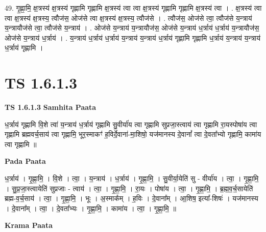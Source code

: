 \documentclass[17pt]{extarticle}
\begin{document}
49. गृ॒ह्णा॒मि॒ क्ष॒त्रस्य॑ क्ष॒त्रस्य॑ गृह्णामि गृह्णामि क्ष॒त्रस्य॑ त्वा त्वा क्ष॒त्रस्य॑ गृह्णामि गृह्णामि क्ष॒त्रस्य॑ त्वा । . क्ष॒त्रस्य॑ त्वा त्वा क्ष॒त्रस्य॑ क्ष॒त्रस्य॒ त्वौज॑स॒ ओज॑से त्वा क्ष॒त्रस्य॑ क्ष॒त्रस्य॒ त्वौज॑से । . त्वौज॑स॒ ओज॑से त्वा॒ त्वौज॑से य॒न्त्राय॑ य॒न्त्रायौज॑से त्वा॒ त्वौज॑से य॒न्त्राय॑ । . ओज॑से य॒न्त्राय॑ य॒न्त्रायौज॑स॒ ओज॑से य॒न्त्राय॑ ध॒र्त्राय॑ ध॒र्त्राय॑ य॒न्त्रायौज॑स॒ ओज॑से य॒न्त्राय॑ ध॒र्त्राय॑ । . य॒न्त्राय॑ ध॒र्त्राय॑ ध॒र्त्राय॑ य॒न्त्राय॑ य॒न्त्राय॑ ध॒र्त्राय॑ गृह्णामि गृह्णामि ध॒र्त्राय॑ य॒न्त्राय॑ य॒न्त्राय॑ ध॒र्त्राय॑ गृह्णामि । \newline
\pagebreak
{}
\section*{ TS 1.6.1.3 }

\textbf{TS 1.6.1.3 } \newline
\textbf{Samhita Paata} \newline

ध॒र्त्राय॑ गृह्णामि वि॒शे त्वा॑ य॒न्त्राय॑ ध॒र्त्राय॑ गृह्णामि सु॒वीर्या॑य त्वा गृह्णामि सुप्रजा॒स्त्वाय॑ त्वा गृह्णामि रा॒यस्पोषा॑य त्वा गृह्णामि ब्रह्मवर्च॒साय॑ त्वा गृह्णामि॒ भूर॒स्माकꣳ॑ ह॒विर्दे॒वाना॑-मा॒शिषो॒ यज॑मानस्य दे॒वानां᳚ त्वा दे॒वता᳚भ्यो गृह्णामि॒ कामा॑य त्वा गृह्णामि ॥ \newline

\textbf{Pada Paata} \newline

ध॒र्त्राय॑ । गृ॒ह्णा॒मि॒ । वि॒शे । त्वा॒ । य॒न्त्राय॑ । ध॒र्त्राय॑ । गृ॒ह्णा॒मि॒ । सु॒वीर्या॒येति॑ सु - वीर्या॑य । त्वा॒ । गृ॒ह्णा॒मि॒ । सु॒प्र॒जा॒स्त्वायेति॑ सुप्रजाः - त्वाय॑ । त्वा॒ । गृ॒ह्णा॒मि॒ । रा॒यः । पोषा॑य । त्वा॒ । गृ॒ह्णा॒मि॒ । ब्र॒ह्म॒व॒र्च॒सायेति॑ ब्रह्म-व॒र्च॒साय॑ । त्वा॒ । गृ॒ह्णा॒मि॒ । भूः । अ॒स्माक᳚म् । ह॒विः । दे॒वाना᳚म् । आ॒शिष॒ इत्या᳚-शिषः॑ । यज॑मानस्य । दे॒वाना᳚म् । त्वा॒ । दे॒वता᳚भ्यः । गृ॒ह्णा॒मि॒ । कामा॑य । त्वा॒ । गृ॒ह्णा॒मि॒ ॥  \newline


\textbf{Krama Paata} \newline
\end{document}
